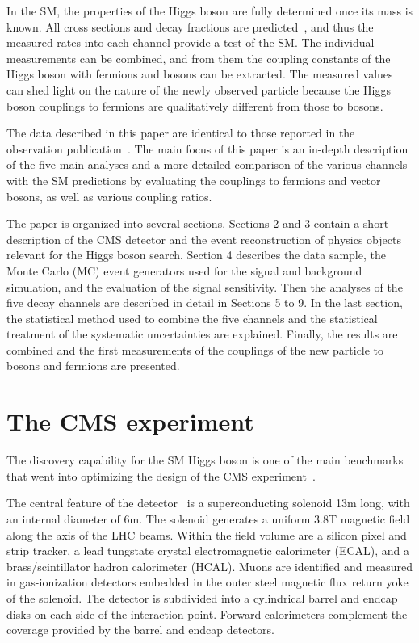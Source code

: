 \documentclass[11pt,twoside,a4paper,cmspaper,final,collab]{cms-tdr}
\begin{document}
In the SM, the properties of the Higgs boson are fully determined once its mass is
known.  All cross sections and decay fractions are
predicted~\cite{LHCHiggsCrossSectionWorkingGroup:2011ti,Dittmaier:2012vm},
and thus the measured rates into each channel provide a test of the SM.
The individual measurements can be combined, and from them the coupling constants
of the Higgs boson with fermions and bosons can be extracted.
The measured values can shed light on  the nature of the newly
observed particle because the Higgs boson
couplings to fermions are qualitatively different from those to bosons.

The data described in this paper are
identical to those reported in
the observation publication~\cite{CMSobservation125}. The main focus of this paper
is an in-depth description of the five main analyses and a more detailed
comparison of the various channels with the SM predictions by
evaluating the couplings to fermions and vector bosons, as well as various coupling ratios.

The paper is organized into several sections. Sections 2 and 3 contain a short description of the CMS detector
and the event reconstruction of physics objects relevant for the Higgs boson search.
Section 4 describes the data sample, the Monte Carlo (MC) event generators used for the signal
and background simulation, and the evaluation of the signal sensitivity.
Then the analyses of the five decay channels
are described in detail in Sections 5 to 9.
In the last section, the statistical method used to combine the five channels and the statistical treatment of the systematic uncertainties
are explained. Finally, the results are combined and the first measurements of the couplings of the new particle to bosons and fermions
are presented.




\section{The CMS experiment}\label{sec:experiment}
The discovery capability for the SM Higgs boson is one of the
main benchmarks that went into optimizing the design of the
CMS experiment~\cite{Pimia:1990zy,DellaNegra:1992hp,Ellis:1994sq,Chatrchyan:2008aa}.

The central feature of the detector~\cite{Chatrchyan:2008aa} is a superconducting solenoid 13\unit{m} long,
with an internal diameter of 6\unit{m}.  The solenoid generates a uniform 3.8\unit{T} magnetic
field along the axis of the LHC beams.  Within the field volume are a silicon
pixel and strip tracker, a lead tungstate crystal electromagnetic calorimeter (ECAL),
and a brass/scintillator hadron calorimeter (HCAL).  Muons are identified and measured in gas-ionization
detectors embedded in the outer steel magnetic flux return yoke of the solenoid.
The detector is subdivided into a cylindrical barrel and endcap disks on each side of
the interaction point.  Forward calorimeters
complement the coverage provided by the barrel and endcap detectors.
\end{document}
